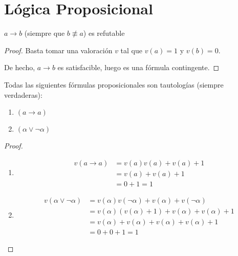 \section{Lógica Proposicional}

\begin{ejemplo}
    $a\to b$ (siempre que $b\not\equiv a$) es refutable
\end{ejemplo}
\begin{proof}
    Basta tomar una valoración $v$ tal que $v(a)=1$ y $v(b)=0$.

    De hecho, $a\to b$ es satisfacible, luego es una fórmula contingente.
\end{proof}

\begin{ejemplo}
    Todas las siguientes fórmulas proposicionales son tautologías (siempre verdaderas):
    \begin{enumerate}
        \item $(a\rightarrow a)$
        \item $(\alpha\lor \lnot \alpha)$
    \end{enumerate}
\end{ejemplo}
\begin{proof}
    \ 
    \begin{enumerate}
        \item 
            \begin{align*}
                v(a\rightarrow a) &= v(a)v(a)+v(a)+1 \\
                         &= v(a) + v(a) + 1 \\
                         &= 0 + 1 = 1
            \end{align*}
        \item 
            \begin{align*}
                v(\alpha\lor \lnot \alpha) &= v(\alpha)v(\lnot \alpha) + v(\alpha) + v(\lnot \alpha)\\
                                          &= v(\alpha)(v(\alpha)+1) + v(\alpha) + v(\alpha) + 1 \\
                                          &= v(\alpha) + v(\alpha) + v(\alpha) + v(\alpha) + 1\\
                                          &= 0 + 0 + 1 = 1
            \end{align*}
    \end{enumerate}
\end{proof}
